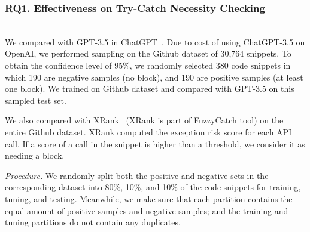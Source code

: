 \subsubsection{RQ1. Effectiveness on Try-Catch Necessity Checking}~\\
 We compared {\xblock} with
GPT-3.5 in ChatGPT~\cite{ChatGPT}. Due to cost of using ChatGPT-3.5 on
OpenAI, we performed sampling on the Github dataset of 30,764
snippets. To obtain the confidence level of 95\%, we randomly selected
380 code snippets in which 190 are negative samples
(no  block), and 190 are positive samples (at least
one  block). We trained on Github dataset and
compared with GPT-3.5 on this sampled test set.

We also compared {\xblock} with XRank~\cite{xrank-fse20} (XRank is
part of FuzzyCatch tool) on the entire Github dataset. XRank computed
the exception risk score for each API call. If a score of a call in
the snippet is higher than a threshold, we consider it as needing a
 block.

{\em Procedure.} We randomly split both the positive and negative sets
in the corresponding dataset into 80\%, 10\%, and 10\% of the code
snippets for training, tuning, and testing. Meanwhile, we make sure
that each partition contains the equal amount of positive samples and
negative samples; and the training and tuning partitions do not
contain any duplicates. 


